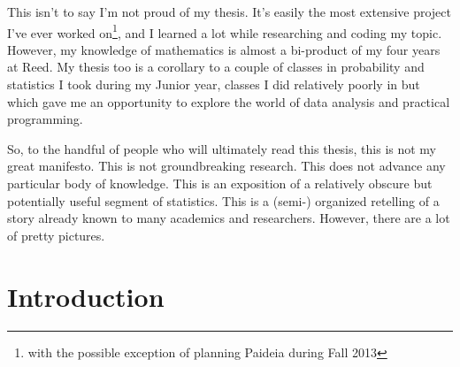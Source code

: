 \documentclass[12pt,twoside]{reedthesis}
\begin{document}
	This isn't to say I'm not proud of my thesis. It's easily the most extensive project I've ever worked on\footnote{with the possible exception of planning Paideia during Fall 2013}, and I learned a lot while researching and coding my topic. However, my knowledge of mathematics is almost a bi-product of my four years at Reed. My thesis too is a corollary to a couple of classes in probability and statistics I took during my Junior year, classes I did relatively poorly in but which gave me an opportunity to explore the world of data analysis and practical programming. 
	
	So, to the handful of people who will ultimately read this thesis, this is not my great manifesto. This is not groundbreaking research. This does not advance any particular body of knowledge. This is an exposition of a relatively obscure but potentially useful segment of statistics. This is a (semi-) organized retelling of a story already known to many academics and researchers. However, there are a lot of pretty pictures. 
	
	
	
	
	
    \tableofcontents
    \listoftables
    \listoffigures

	

  \mainmatter %
  \pagestyle{fancyplain} %


    \chapter*{Introduction}
	
\end{document}
